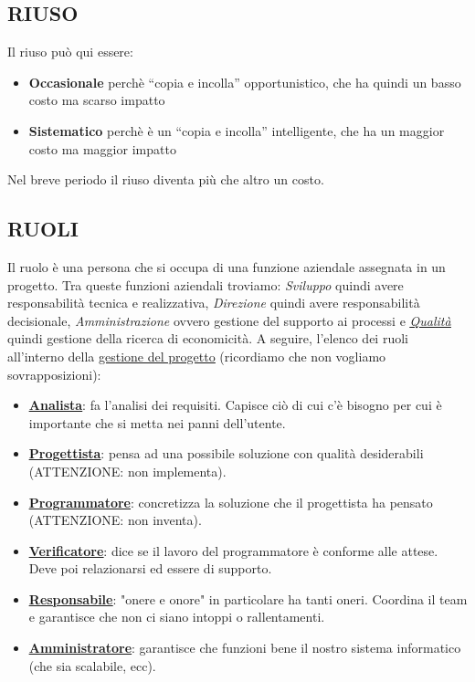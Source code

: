 		\subsection{RIUSO}  \label{riuso}
		Il riuso può qui essere:
			\begin{itemize}
				\item \textbf{Occasionale} perchè ``copia e incolla'' opportunistico, che ha quindi un basso costo ma scarso impatto
				\item \textbf{Sistematico} perchè è un ``copia e incolla'' intelligente, che ha un maggior costo ma maggior impatto
			\end{itemize}
		Nel breve periodo il riuso diventa più che altro un costo.


		\subsection{RUOLI}  \label{ruoli}
		Il ruolo è una persona che si occupa di una funzione aziendale assegnata in un progetto. Tra queste funzioni aziendali troviamo: \textit{Sviluppo} quindi avere responsabilità tecnica e realizzativa, \textit{Direzione} quindi avere responsabilità decisionale, \textit{Amministrazione} ovvero gestione del supporto ai processi e \textit{\underline{\hyperref[qualita]{Qualità}}} quindi gestione della ricerca di economicità.
		A seguire, l'elenco dei ruoli all'interno della \underline{\hyperref[gestioneprogetto]{gestione del progetto}} (ricordiamo che non vogliamo sovrapposizioni):
		\begin{itemize}
		\item \textbf{\underline{\hyperref[analista]{Analista}}}: fa l'analisi dei requisiti. Capisce ciò di cui c'è bisogno per cui è importante che si metta nei panni dell'utente.
		\item \textbf{\underline{\hyperref[progettista]{Progettista}}}: pensa ad una possibile soluzione con qualità desiderabili (ATTENZIONE: non implementa).
		\item \textbf{\underline{\hyperref[programmatore]{Programmatore}}}: concretizza la soluzione che il progettista ha pensato (ATTENZIONE: non inventa).
		\item \textbf{\underline{\hyperref[verificatore]{Verificatore}}}: dice se il lavoro del programmatore è conforme alle attese. Deve poi relazionarsi ed essere di supporto.
		\item \textbf{\underline{\hyperref[responsabile]{Responsabile}}}: "onere e onore" in particolare ha tanti oneri. Coordina il team e garantisce che non ci siano intoppi o rallentamenti.
		\item \textbf{\underline{\hyperref[amministratore]{Amministratore}}}: garantisce che funzioni bene il nostro sistema informatico (che sia scalabile, ecc).
		\end{itemize}
